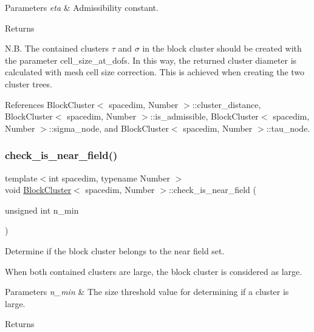 \begin{DoxyParams}{Parameters}
{\em eta} & Admissibility constant. \\
\hline
\end{DoxyParams}
\begin{DoxyReturn}{Returns}

\end{DoxyReturn}
N.\+B. The contained clusters $\tau$ and $\sigma$ in the block cluster should be created with the parameter {\ttfamily cell\+\_\+size\+\_\+at\+\_\+dofs}. In this way, the returned cluster diameter is calculated with mesh cell size correction. This is achieved when creating the two cluster trees.

References Block\+Cluster$<$ spacedim, Number $>$\+::cluster\+\_\+distance, Block\+Cluster$<$ spacedim, Number $>$\+::is\+\_\+admissible, Block\+Cluster$<$ spacedim, Number $>$\+::sigma\+\_\+node, and Block\+Cluster$<$ spacedim, Number $>$\+::tau\+\_\+node.

\mbox{\label{classBlockCluster_a44900c760eac0578f700fa678ef4e416}} 
\subsubsection{\texorpdfstring{check\+\_\+is\+\_\+near\+\_\+field()}{check\_is\_near\_field()}}
{\footnotesize\ttfamily template$<$int spacedim, typename Number $>$ \\
void \hyperlink{classBlockCluster}{Block\+Cluster}$<$ spacedim, Number $>$\+::check\+\_\+is\+\_\+near\+\_\+field (\begin{DoxyParamCaption}\item[{unsigned int}]{n\+\_\+min }\end{DoxyParamCaption})}

Determine if the block cluster belongs to the near field set.

When both contained clusters are large, the block cluster is considered as large. 
\begin{DoxyParams}{Parameters}
{\em n\+\_\+min} & The size threshold value for determining if a cluster is large. \\
\hline
\end{DoxyParams}
\begin{DoxyReturn}{Returns}

\end{DoxyReturn}


